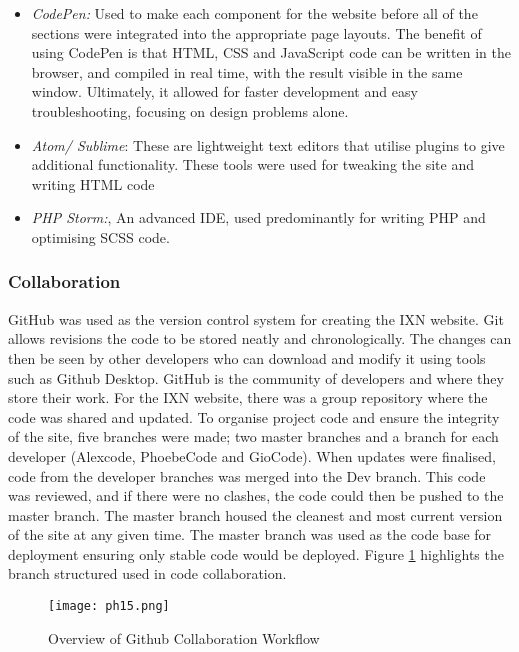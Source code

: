 \documentclass[fontsize=11pt]{extarticle}
\numberwithin{figure}{section} %
\numberwithin{table}{section}%
\providecommand{\tightlist}{%
  \setlength{\itemsep}{0pt}\setlength{\parskip}{0pt}}
\begin{document}
\begin{itemize}
\tightlist
\item
  \emph{CodePen:} Used to make each component for the website before all
  of the sections were integrated into the appropriate page layouts. The
  benefit of using CodePen is that HTML, CSS and JavaScript code can be
  written in the browser, and compiled in real time, with the result
  visible in the same window. \cite{p19} Ultimately, it allowed for
  faster development and easy troubleshooting, focusing on design
  problems alone.
\item
  \emph{Atom/ Sublime}: These are lightweight text editors that utilise
  plugins to give additional functionality. These tools were used for
  tweaking the site and writing HTML code
\item
  \emph{PHP Storm:}, An advanced IDE, used predominantly for writing PHP
  and optimising SCSS code.
\end{itemize}

\hypertarget{collaboration}{%
\subsubsection{Collaboration}\label{collaboration}}

GitHub was used as the version control system for creating the IXN
website. Git allows revisions the code to be stored neatly and
chronologically. The changes can then be seen by other developers who
can download and modify it using tools such as Github Desktop.
\cite{p20} GitHub is the community of developers and where they store
their work. For the IXN website, there was a group repository where the
code was shared and updated. To organise project code and ensure the
integrity of the site, five branches were made; two master branches and
a branch for each developer (Alexcode, PhoebeCode and GioCode). When
updates were finalised, code from the developer branches was merged into
the Dev branch. This code was reviewed, and if there were no clashes,
the code could then be pushed to the master branch. The master branch
housed the cleanest and most current version of the site at any given
time. The master branch was used as the code base for deployment
ensuring only stable code would be deployed. Figure \ref{githubcollab}
highlights the branch structured used in code collaboration.

\begin{figure}[H]
    \centering
    \texttt{[image: ph15.png]}
    \caption{Overview of Github Collaboration Workflow}
  \label{githubcollab}
\end{figure}
\end{document}
